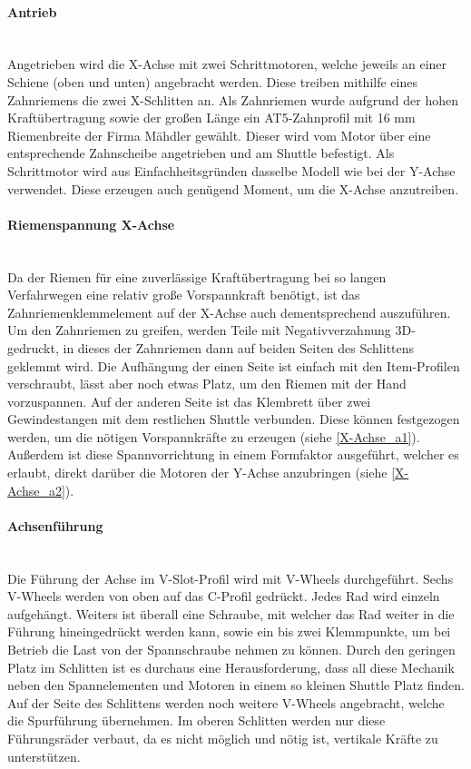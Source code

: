 \paragraph{Antrieb}\mbox{}\\
Angetrieben wird die X-Achse mit zwei Schrittmotoren, welche jeweils an einer Schiene (oben und unten) angebracht werden. Diese treiben mithilfe eines Zahnriemens die zwei X-Schlitten an. Als Zahnriemen wurde aufgrund der hohen Kraftübertragung sowie der großen Länge ein AT5-Zahnprofil mit 16 mm Riemenbreite der Firma Mähdler gewählt. Dieser wird vom Motor über eine entsprechende Zahnscheibe angetrieben und am Shuttle befestigt. Als Schrittmotor wird aus Einfachheitsgründen dasselbe Modell wie bei der Y-Achse verwendet. Diese erzeugen auch genügend Moment, um die X-Achse anzutreiben.

\paragraph{Riemenspannung X-Achse} \mbox{}\\
Da der Riemen für eine zuverlässige Kraftübertragung bei so langen Verfahrwegen eine relativ große Vorspannkraft benötigt, ist das Zahnriemenklemmelement auf der X-Achse auch dementsprechend auszuführen. Um den Zahnriemen zu greifen, werden Teile mit Negativverzahnung 3D-gedruckt, in dieses der Zahnriemen dann auf beiden Seiten des Schlittens geklemmt wird. Die Aufhängung der einen Seite ist einfach mit den Item-Profilen verschraubt, lässt aber noch etwas Platz, um den Riemen mit der Hand vorzuspannen. Auf der anderen Seite ist das Klembrett über zwei Gewindestangen mit dem restlichen Shuttle verbunden. Diese können festgezogen werden, um die nötigen Vorspannkräfte zu erzeugen (siehe \ref{X-Achse_a1}). Außerdem ist diese Spannvorrichtung in einem Formfaktor ausgeführt, welcher es erlaubt, direkt darüber die Motoren der Y-Achse anzubringen (siehe \ref{X-Achse_a2}).

\paragraph{Achsenführung} \mbox{}\\
Die Führung der Achse im V-Slot-Profil wird mit V-Wheels durchgeführt. Sechs V-Wheels werden von oben auf das C-Profil gedrückt. Jedes Rad wird einzeln aufgehängt. Weiters ist überall eine Schraube, mit welcher das Rad weiter in die Führung hineingedrückt werden kann, sowie ein bis zwei Klemmpunkte, um bei Betrieb die Last von der Spannschraube nehmen zu können. Durch den geringen Platz im Schlitten ist es durchaus eine Herausforderung, dass all diese Mechanik neben den Spannelementen und Motoren in einem so kleinen Shuttle Platz finden. Auf der Seite des Schlittens werden noch weitere V-Wheels angebracht, welche die Spurführung übernehmen.
Im oberen Schlitten werden nur diese Führungsräder verbaut, da es nicht möglich und nötig ist, vertikale Kräfte zu unterstützen.

